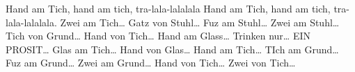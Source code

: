 \beginverse
Hand am Tich, hand am tich, tra-lala-lalalala
Hand am Tich, hand am tich, tra-lala-lalalala.
\endverse
\beginverse
Zwei am Tich…
\endverse
\beginverse
Gatz von Stuhl…
\endverse
\beginverse
Fuz am Stuhl…
\endverse
\beginverse
Zwei am Stuhl…
\endverse
\beginverse
Tich von Grund…
\endverse
\beginverse
Hand von Tich…
\endverse
\beginverse
Hand am Glass…
\endverse
\beginverse
Trinken nur…
\endverse
\beginverse
EIN PROSIT…
\endverse
\beginverse
Glas am Tich…
\endverse
\beginverse
Hand von Glas…
\endverse
\beginverse
Hand am Tich…
\endverse
\beginverse
TIch am Grund…
\endverse
\beginverse
Fuz am Grund…
\endverse
\beginverse
Zwei am Grund…
\endverse
\beginverse
Hand von Tich…
\endverse
\beginverse
Zwei von Tich…
\endverse
\endsong